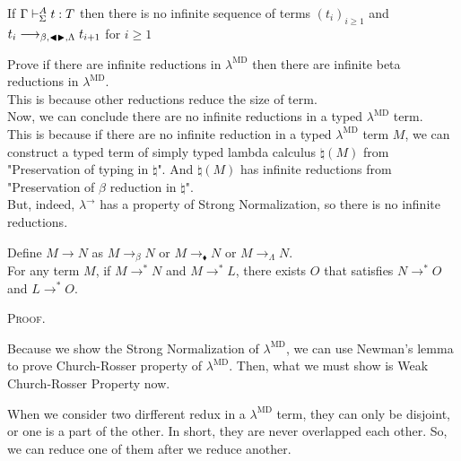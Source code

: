 \begin{theorem}
	If $\Gamma\vdash_\Sigma^A t:T$ then there is no infinite sequence of terms $(t_i)_{i\ge1}$ and $t_i \longrightarrow_{\beta, {\mathop{\blacktriangleleft}} {\mathop{\blacktriangleright}},\Lambda} t_{i+1}$ for $i\ge 1$
\end{theorem}
	
Prove if there are infinite reductions in $\lambda^{\text{MD}}$ then there are infinite beta reductions in $\lambda^{\text{MD}}$.\\
This is because other reductions reduce the size of term.\\
	
Now, we can conclude there are no infinite reductions in a typed $\lambda^{\text{MD}}$ term. \\
	
This is because if there are no infinite reduction in a typed $\lambda^{\text{MD}}$ term $M$,
we can construct a typed term of simply typed lambda calculus $\natural(M)$ from "Preservation of typing in $\natural$".
And $\natural(M)$ has infinite reductions from "Preservation of $\beta$ reduction in $\natural$".\\
	
But, indeed, $\lambda^\to$ has a property of Strong Normalization, so there is no infinite reductions.
	
\begin{theorem}
	Define $M \longrightarrow N$ as $M \longrightarrow_{\beta} N$ or $M\longrightarrow_\blacklozenge N$ or  $M \longrightarrow_{\Lambda} N$.\\
	For any term $M$, if $M \longrightarrow^* N$ and $M \longrightarrow^* L$,
	there exists $O$ that satisfies $N \longrightarrow^* O$ and $L \longrightarrow^* O$.
\end{theorem}
	
\textsc{Proof.}
	
Because we show the Strong Normalization of $\lambda^{\text{MD}}$, we can use Newman's lemma to prove Church-Rosser property of $\lambda^{\text{MD}}$.
Then, what we must show is Weak Church-Rosser Property now.
	
When we consider two dirfferent redux in a $\lambda^{\text{MD}}$ term, they can only be disjoint, or one is a part of the other.
In short, they are never overlapped each other.
So, we can reduce one of them after we reduce another.\\
	
